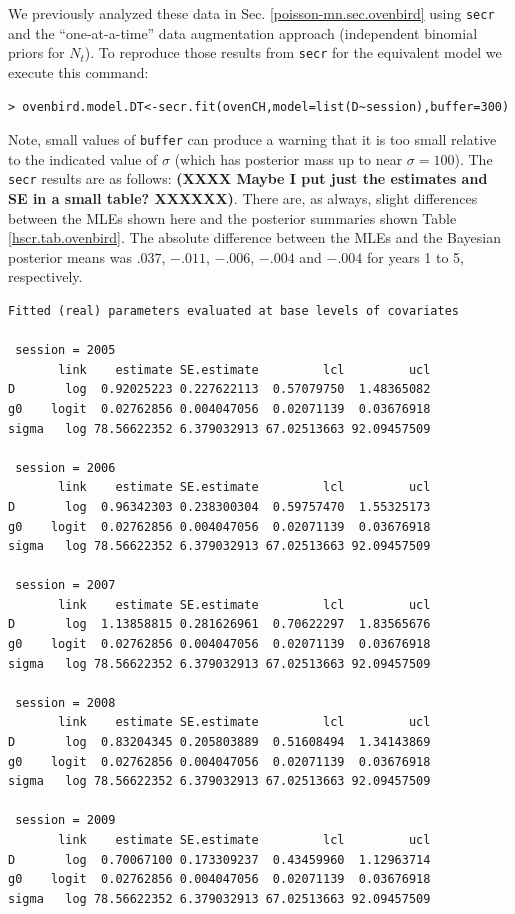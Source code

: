 We previously analyzed these data in
Sec. \ref{poisson-mn.sec.ovenbird} using \mbox{\tt secr} and the
``one-at-a-time'' data augmentation approach (independent binomial
priors for $N_{t}$).  To reproduce those results from \mbox{\tt secr}
for the equivalent model we execute this command:
\begin{verbatim}
> ovenbird.model.DT<-secr.fit(ovenCH,model=list(D~session),buffer=300)
\end{verbatim}
Note, small values of \mbox{\tt buffer} can produce a warning that it
is too small relative to the indicated value of $\sigma$ (which has
posterior mass up to near $\sigma = 100$).  The \mbox{\tt secr}
results are as follows: {\bf (XXXX Maybe I put just the estimates and
  SE in a small table? XXXXXX)}. There are, as always, slight
differences between the MLEs shown here and the posterior summaries
shown Table \ref{hscr.tab.ovenbird}.
The absolute difference between the MLEs and the Bayesian posterior
means was $.037$,  $-.011$,  $-.006$,  $-.004$ and $-.004$ for years 1
to 5, respectively. 

{\small
\begin{verbatim}
Fitted (real) parameters evaluated at base levels of covariates 

 session = 2005 
       link    estimate SE.estimate         lcl         ucl
D       log  0.92025223 0.227622113  0.57079750  1.48365082
g0    logit  0.02762856 0.004047056  0.02071139  0.03676918
sigma   log 78.56622352 6.379032913 67.02513663 92.09457509

 session = 2006 
       link    estimate SE.estimate         lcl         ucl
D       log  0.96342303 0.238300304  0.59757470  1.55325173
g0    logit  0.02762856 0.004047056  0.02071139  0.03676918
sigma   log 78.56622352 6.379032913 67.02513663 92.09457509

 session = 2007 
       link    estimate SE.estimate         lcl         ucl
D       log  1.13858815 0.281626961  0.70622297  1.83565676
g0    logit  0.02762856 0.004047056  0.02071139  0.03676918
sigma   log 78.56622352 6.379032913 67.02513663 92.09457509

 session = 2008 
       link    estimate SE.estimate         lcl         ucl
D       log  0.83204345 0.205803889  0.51608494  1.34143869
g0    logit  0.02762856 0.004047056  0.02071139  0.03676918
sigma   log 78.56622352 6.379032913 67.02513663 92.09457509

 session = 2009 
       link    estimate SE.estimate         lcl         ucl
D       log  0.70067100 0.173309237  0.43459960  1.12963714
g0    logit  0.02762856 0.004047056  0.02071139  0.03676918
sigma   log 78.56622352 6.379032913 67.02513663 92.09457509
\end{verbatim}
}







